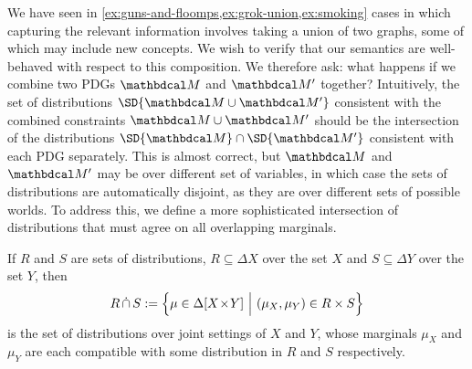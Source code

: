 \begin{vfull}
We have seen
	in \cref{ex:guns-and-floomps,ex:grok-union,ex:smoking} cases in
	which capturing the relevant information involves taking a
	union of two graphs, some of which may include new
	concepts. We wish to verify that our semantics are
	well-behaved with respect to this composition.	  
We therefore ask: what happens if we combine two PDGs $\dg M$
	and $\dg M'$ together? Intuitively, the set of distributions
	$\SD{\dg M \cup \dg M'}$ consistent with the combined
	constraints $\dg M\cup \dg M'$ should be the intersection of the
	distributions $\SD{\dg M} \cap \SD{\dg M'}$ consistent
	with each PDG separately. This is almost correct, but $\dg M$
	and $\dg M'$ may be over different set of variables, in which
	case the sets of distributions are automatically disjoint, as
	they are over different sets of possible worlds. To address
	this, we define a more sophisticated intersection of
	distributions that must agree on all overlapping
	marginals. %

\begin{defn}[$\dcap$]\label{def:marginal-dist-intersection}
	If $R$ and $S$ are sets of distributions, $R \subseteq \Delta X$ over the set $X$ and $S\subseteq \Delta Y$ over the set $Y$, then
		{$$R \operatorname{\mathop{\dot\cap}} S := \Big\{ \mu \in  \Delta [X \!\times\! Y] ~\Big|~ (\mu_{X}, \mu_{Y}) \in R \times S \Big\}  $$}%
	is the set of distributions over joint settings of $X$ and $Y$, whose marginals $\mu_X$ and $\mu_Y$ are each compatible with some distribution in $R$ and $S$ respectively. 
	

\end{defn}
\end{vfull}
